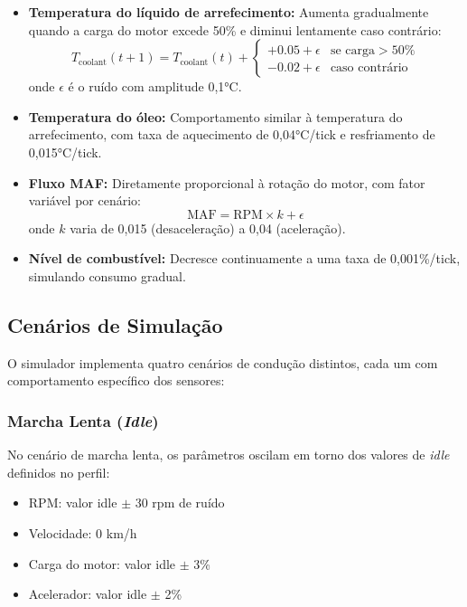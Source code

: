 \begin{itemize}
    \item \textbf{Temperatura do líquido de arrefecimento:} Aumenta gradualmente quando a carga do motor excede 50\% e diminui lentamente caso contrário:
    \begin{equation}
    T_{\text{coolant}}(t+1) = T_{\text{coolant}}(t) + 
    \begin{cases}
    +0.05 + \epsilon & \text{se carga} > 50\% \\
    -0.02 + \epsilon & \text{caso contrário}
    \end{cases}
    \end{equation}
    onde $\epsilon$ é o ruído com amplitude 0,1°C.
    
    \item \textbf{Temperatura do óleo:} Comportamento similar à temperatura do arrefecimento, com taxa de aquecimento de 0,04°C/tick e resfriamento de 0,015°C/tick.
    
    \item \textbf{Fluxo MAF:} Diretamente proporcional à rotação do motor, com fator variável por cenário:
    \begin{equation}
    \text{MAF} = \text{RPM} \times k + \epsilon
    \end{equation}
    onde $k$ varia de 0,015 (desaceleração) a 0,04 (aceleração).
    
    \item \textbf{Nível de combustível:} Decresce continuamente a uma taxa de 0,001\%/tick, simulando consumo gradual.
\end{itemize}

\subsection{Cenários de Simulação}

O simulador implementa quatro cenários de condução distintos, cada um com comportamento específico dos sensores:

\subsubsection{Marcha Lenta (\textit{Idle})}

No cenário de marcha lenta, os parâmetros oscilam em torno dos valores de \textit{idle} definidos no perfil:
\begin{itemize}
    \item RPM: valor idle $\pm$ 30 rpm de ruído
    \item Velocidade: 0 km/h
    \item Carga do motor: valor idle $\pm$ 3\%
    \item Acelerador: valor idle $\pm$ 2\%
\end{itemize}

